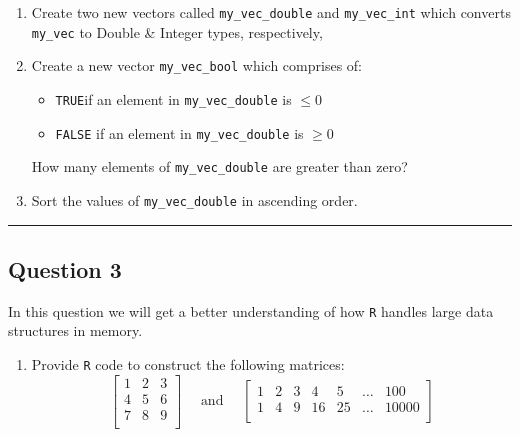 \documentclass[
  letterpaper,
  DIV=11,
  numbers=noendperiod]{scrartcl}
\providecommand{\tightlist}{%
  \setlength{\itemsep}{0pt}\setlength{\parskip}{0pt}}\usepackage{longtable,booktabs,array}
\begin{document}
\begin{enumerate}
\def\labelenumi{\arabic{enumi}.}
\item
  Create two new vectors called \texttt{my\_vec\_double} and
  \texttt{my\_vec\_int} which converts \texttt{my\_vec} to Double \&
  Integer types, respectively,
\item
  Create a new vector \texttt{my\_vec\_bool} which comprises of:

  \begin{itemize}
  \tightlist
  \item
    \texttt{TRUE}if an element in \texttt{my\_vec\_double} is \(\le 0\)
  \item
    \texttt{FALSE} if an element in \texttt{my\_vec\_double} is
    \(\ge 0\)
  \end{itemize}

  How many elements of \texttt{my\_vec\_double} are greater than zero?
\item
  Sort the values of \texttt{my\_vec\_double} in ascending order.
\end{enumerate}

\begin{center}\rule{0.5\linewidth}{0.5pt}\end{center}

\hypertarget{question-3}{%
\subsection{Question 3}\label{question-3}}

\begin{tcolorbox}[enhanced jigsaw, opacityback=0, rightrule=.15mm, leftrule=.75mm, colframe=quarto-callout-tip-color-frame, bottomrule=.15mm, opacitybacktitle=0.6, colbacktitle=quarto-callout-tip-color!10!white, toptitle=1mm, coltitle=black, bottomtitle=1mm, left=2mm, breakable, arc=.35mm, titlerule=0mm, title=\textcolor{quarto-callout-tip-color}{\faLightbulb}\hspace{0.5em}{50 points}, toprule=.15mm, colback=white]

\end{tcolorbox}

In this question we will get a better understanding of how \texttt{R}
handles large data structures in memory.

\begin{enumerate}
\def\labelenumi{\arabic{enumi}.}
\tightlist
\item
  Provide \texttt{R} code to construct the following matrices: \[
  \begin{bmatrix} 
  1 & 2 & 3\\
  4 & 5 & 6\\
  7 & 8 & 9\\
  \end{bmatrix}
  \quad \text{ and } \quad
  \begin{bmatrix} 
  1 & 2 & 3 & 4 & 5 & \dots & 100\\
  1 & 4 & 9 & 16 & 25 & \dots & 10000\\
  \end{bmatrix}
  \]
\end{enumerate}
\end{document}
